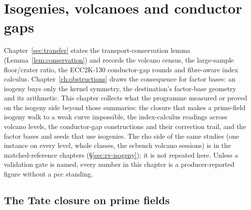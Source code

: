 
\chapter{Isogenies, volcanoes and conductor gaps}\label{ch:isogenies}

Chapter~\ref{sec:transfer} states the transport-conservation lemma
(Lemma~\ref{lem:conservation}) and records the volcano census, the
large-sample floor/crater ratio, the ECC2K-130 conductor-gap rounds and
fibre-aware index calculus. Chapter~\ref{ch:obstructions} draws the
consequence for factor bases: an isogeny buys only the kernel symmetry,
the destination's factor-base geometry and its arithmetic. This chapter
collects what the programme measured or proved on the isogeny side beyond
those summaries: the closure that makes a prime-field isogeny walk to a
weak curve impossible, the index-calculus readings across volcano levels,
the conductor-gap constructions and their correction trail, and the
factor bases and seeds that use isogenies. The rho side of the same
studies (one instance on every level, whole classes, the ecbench volcano
sessions) is in the matched-reference chapters (\S\ref{sec:rv-isogeny});
it is not repeated here. Unless a validation gate is named, every number in
this chapter is a producer-reported figure without a pcc standing.

\section{The Tate closure on prime fields}\label{sec:iso-tate}

